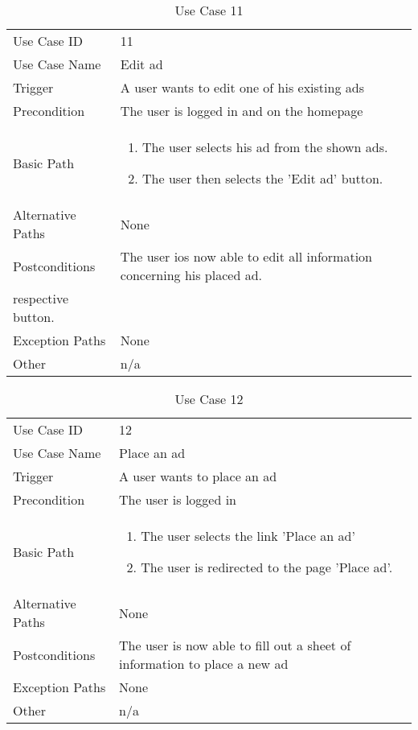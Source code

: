 \begin{table}[H]
\centering
\label{table-use-case-11}
\begin{tabular}{|p{3cm}|p{10cm}}
Use Case ID       & 11                                                        \\
Use Case Name     & Edit ad                            \\
Trigger           & A user wants to edit one of his existing ads\\
Precondition      & The user is logged in and on the homepage             \\
Basic Path        & \begin{enumerate}
\item The user selects his ad from the shown ads.
\item The user then selects the 'Edit ad' button.  
\end{enumerate} 
     \\
Alternative Paths & None                          \\
Postconditions    & The user ios now able to edit all information concerning his
placed ad. \\
respective button.	\\
Exception Paths   & None			\\
Other             & n/a                                                                                                                                                                                                        
\end{tabular}
\caption{Use Case 11}
\end{table}


\begin{table}[H]
\centering
\label{table-use-case-12}
\begin{tabular}{|p{3cm}|p{10cm}}
Use Case ID       & 12                                                        \\
Use Case Name     & Place an ad                            \\
Trigger           & A user wants to place an ad\\
Precondition      & The user is logged in             \\
Basic Path        & \begin{enumerate}
\item The user selects the link 'Place an ad'
\item The user is redirected to the page 'Place ad'. 
\end{enumerate} 
     \\
Alternative Paths & None                          \\
Postconditions    & The user is now able to fill out a sheet of information to
place a new ad	\\
Exception Paths   & None			\\
Other             & n/a                                                                                                                                                                                                        
\end{tabular}
\caption{Use Case 12}
\end{table}


